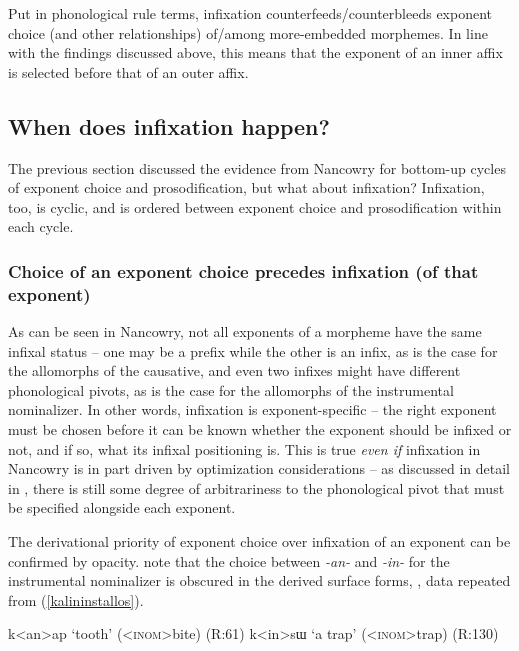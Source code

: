 \documentclass[output=paper]{langscibook}
\begin{document}
Put in phonological rule terms, infixation counterfeeds/counterbleeds exponent choice (and other relationships) of/among more-embedded morphemes. In line with the findings discussed above, this means that the exponent of an inner affix is selected before that of an outer affix.

\subsection{When does infixation happen?}\label{sec:kalin:4.2}

The previous section discussed the evidence from Nancowry for bottom-up cycles of exponent choice and prosodification, but what about infixation? Infixation, too, is cyclic, and is ordered between exponent choice and prosodification within each cycle.

\subsubsection{Choice of an exponent choice precedes infixation (of that exponent)}\label{sec:kalin:4.2.1}

As can be seen in Nancowry, not all exponents of a morpheme have the same infixal status -- one may be a prefix while the other is an infix, as is the case for the allomorphs of the causative, and even two infixes might have different phonological pivots, as is the case for the allomorphs of the instrumental nominalizer. In other words, infixation is exponent-specific -- the right exponent must be chosen before it can be known whether the exponent should be infixed or not, and if so, what its infixal positioning is. This is true \textit{even if} infixation in Nancowry is in part driven by optimization considerations -- as discussed in detail in , there is still some degree of  arbitrariness to the phonological pivot that must be specified alongside each exponent.

The derivational priority of exponent choice over infixation of an exponent can be confirmed by opacity. \citet{KalinRolle21} note that the choice between \textit{-an-} and \textit{-in-} for the instrumental nominalizer is obscured in the derived surface forms, \Next, data repeated from (\ref{kalininstallos}).

\ea 
\ea k<an>ap `tooth' (<\textsc{inom}>bite) \hfill (R:61)\label{kalin18a}
\ex  k<in>sɯ `a trap' (<\textsc{inom}>trap) \hfill (R:130)\label{kalin18b}
\z
\z
\end{document}
